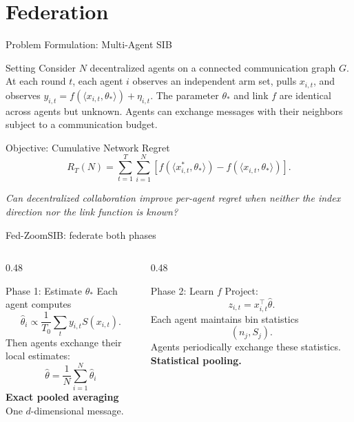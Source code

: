 \documentclass[11pt]{beamer}
\begin{document}
\section{Federation}
\begin{frame}{Problem Formulation: Multi-Agent SIB}
\small
\begin{block}{Setting}
Consider $N$ decentralized agents on a connected communication graph $G$. At each round $t$, each agent $i$ observes an independent arm set, pulls $x_{i,t}$, and observes $y_{i,t}=f(\langle x_{i,t},\theta_*\rangle)+\eta_{i,t}$. The parameter $\theta_*$ and link $f$ are identical across agents but unknown. Agents can exchange messages with their neighbors subject to a communication budget.
\end{block}
\begin{block}{Objective: Cumulative Network Regret}
\[
R_T(N)=\sum_{t=1}^{T}\sum_{i=1}^{N}\left[f(\langle x^*_{i,t},\theta_*\rangle)-f(\langle x_{i,t},\theta_*\rangle)\right].
\]
\end{block}
\begin{center}
\emph{Can decentralized collaboration improve per-agent regret when neither the index direction nor the link function is known?}
\end{center}
\end{frame}

\begin{frame}{Fed-ZoomSIB: federate both phases}
\small
\begin{columns}[T]
\begin{column}{0.48\textwidth}
\begin{block}{Phase 1: Estimate $\theta_*$}
Each agent computes
\[
\hat\theta_i\propto\frac{1}{T_0}\sum_t y_{i,t}S(x_{i,t}).
\]
Then agents exchange their local estimates:
\[
\boxed{\hat\theta=\frac{1}{N}\sum_{i=1}^{N}\hat\theta_i}
\]
\textbf{Exact pooled averaging}\\[-0.2em]
One $d$-dimensional message.
\end{block}
\end{column}
\begin{column}{0.48\textwidth}
\begin{block}{Phase 2: Learn $f$}
Project:
\[
z_{i,t}=x_{i,t}^{\top}\hat\theta.
\]
Each agent maintains bin statistics
\[
(n_j,S_j).
\]
Agents periodically exchange these statistics.
\textbf{Statistical pooling.}
\end{block}
\end{column}
\end{columns}
\vspace{0.2em}
\begin{center}
\end{center}
\end{frame}
\end{document}
